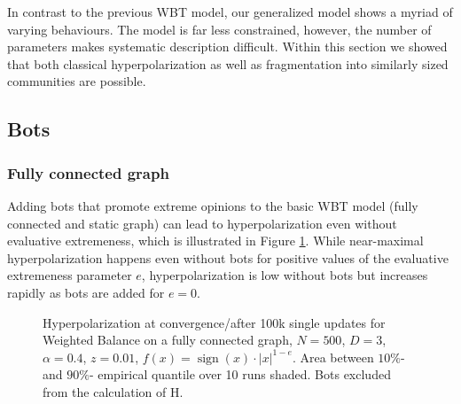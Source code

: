 \documentclass[11pt]{article}
\DeclareMathOperator{\sign}{sign}
\begin{document}
In contrast to the previous WBT model, our generalized model shows a myriad of varying behaviours. The model is far less constrained, however, the number of parameters makes systematic description difficult. Within this section we showed that both classical hyperpolarization as well as fragmentation into similarly sized communities are possible. 
\FloatBarrier
\subsection{Bots}
\subsubsection{Fully connected graph}
Adding bots that promote extreme opinions to the basic WBT model (fully connected and static graph) can lead to hyperpolarization even without evaluative extremeness, which is illustrated in Figure \ref{bots}. While near-maximal hyperpolarization happens even without bots for positive values of the evaluative extremeness parameter $e$, hyperpolarization is low without bots but increases rapidly as bots are added for $e=0$. 
\begin{figure}[!h]
\begin{center}
\end{center}
\caption{Hyperpolarization at convergence/after 100k single updates for Weighted Balance on a fully connected graph, $N=500$, $D=3$, $\alpha=0.4$, $z=0.01$, $f(x)=\sign(x)\cdot|x|^{1-e}$. Area between $10\%$- and $90\%$- empirical quantile over 10 runs shaded. Bots excluded from the calculation of H.}
\label{bots}
\end{figure}
\end{document}
